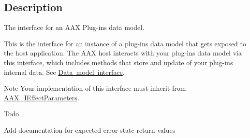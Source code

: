 \subsection{Description}
The interface for an A\+AX Plug-\/in\textquotesingle{}s data model. 

This is the interface for an instance of a plug-\/in\textquotesingle{}s data model that gets exposed to the host application. The A\+AX host interacts with your plug-\/in\textquotesingle{}s data model via this interface, which includes methods that store and update of your plug-\/in\textquotesingle{}s internal data. See \mbox{\hyperlink{a00798}{Data model interface}}.

\begin{DoxyNote}{Note}
Your implementation of this interface must inherit from \mbox{\hyperlink{a01825}{A\+A\+X\+\_\+\+I\+Effect\+Parameters}}.
\end{DoxyNote}
\begin{DoxyRefDesc}{Todo}
\item[\mbox{\hyperlink{a00785__todo000031}{Todo}}]Add documentation for expected error state return values\end{DoxyRefDesc}
